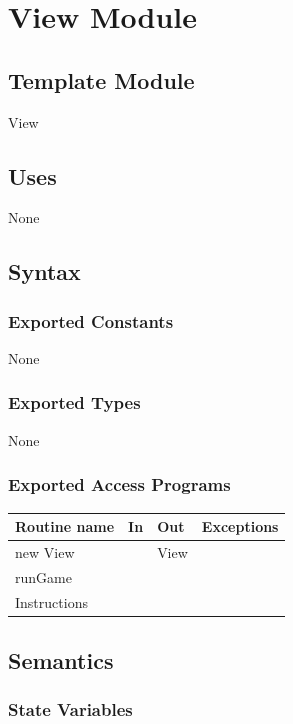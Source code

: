 \documentclass[12pt]{article}
\begin{document}
\newpage

\section* {View Module}

\subsection*{Template Module}

View

\subsection* {Uses}

None

\subsection* {Syntax}

\subsubsection* {Exported Constants}

None

\subsubsection* {Exported Types}

None

\subsubsection* {Exported Access Programs}

\begin{tabular}{| l | l | l | p{5cm} |}
\hline
\textbf{Routine name} & \textbf{In} & \textbf{Out} & \textbf{Exceptions}\\
\hline
new View & & View & ~\\
\hline
runGame & & & ~\\
\hline
Instructions & & & ~\\
\hline
\end{tabular}

\subsection* {Semantics}

\subsubsection* {State Variables}
\end{document}

